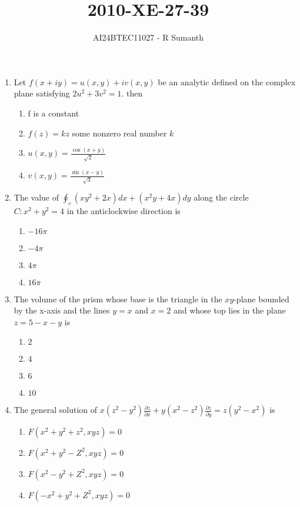 \documentclass[journal,12pt,onecolumn]{IEEEtran}
\theoremstyle{remark}
\begin{document}

\vspace{3cm}

\title{\textbf{2010-XE-27-39}}
\author{AI24BTEC11027 - R Sumanth}
\maketitle
\bigskip

\renewcommand{\thefigure}{\theenumi}
\renewcommand{\thetable}{\theenumi}
\setlength{\columnsep}{2.5em}
\begin{enumerate}

\item Let $f(x+iy)=u(x,y)+iv(x,y)$ be an analytic defined on the complex plane satisfying $2u^2+3v^2=1.$ then 
\begin{enumerate}
    \item f is a constant
    \item $f(z)=kz$ some nonzero real number $k$
    \item $u(x,y)=\frac{\cos(x+y)}{\sqrt{2}}$
    \item $v(x,y)=\frac{\sin(x-y)}{\sqrt{3}}$ \\
\end{enumerate}

\item The value of $\oint_c (xy^2+2x)dx+(x^2y+4x)dy$ along the circle $C:x^2+y^2=4$ in the anticlockwise direction is
\begin{enumerate}
    \item $-16\pi$
    \item $-4\pi$
    \item $4\pi$
    \item $16\pi$ \\
\end{enumerate}

\item The volume of the prism whose base is the triangle in the $xy$-plane bounded by the x-axis and the lines $y=x$ and $x=2$ and whose top lies in the plane $z=5-x-y$ is 
\begin{enumerate}
    \item $2$
    \item $4$
    \item $6$
    \item $10$ \\
\end{enumerate}

\item The general solution of $x(z^2-y^2)\frac{\partial z}{\partial x}+y(x^2-z^2)\frac{\partial z}{\partial y}=z(y^2-x^2)$ is 
\begin{enumerate}
    \item $F(x^2+y^2+z^2,xyz)=0$
    \item $F(x^2+y^2-Z^2,xyz)=0$
    \item $F(x^2-y^2+Z^2,xyz)=0$
    \item $F(-x^2+y^2+Z^2,xyz)=0$ \\
\end{enumerate}


\end{enumerate}
\end{document}
